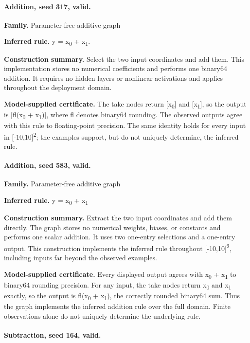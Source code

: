 \paragraph{Addition, seed 317, valid.}

\textbf{Family.} Parameter-free additive graph


\textbf{Inferred rule.} y = x\textsubscript{0} + x\textsubscript{1}.


\textbf{Construction summary.} Select the two input coordinates and add them. This implementation stores no numerical coefficients and performs one binary64 addition. It requires no hidden layers or nonlinear activations and applies throughout the deployment domain.


\textbf{Model-supplied certificate.} The take nodes return [x\textsubscript{0}] and [x\textsubscript{1}], so the output is [fl(x\textsubscript{0} + x\textsubscript{1})], where fl denotes binary64 rounding. The observed outputs agree with this rule to floating-point precision. The same identity holds for every input in [-10,10]\textsuperscript{2}; the examples support, but do not uniquely determine, the inferred rule.


\paragraph{Addition, seed 583, valid.}

\textbf{Family.} Parameter-free additive graph


\textbf{Inferred rule.} y = x\textsubscript{0} + x\textsubscript{1}


\textbf{Construction summary.} Extract the two input coordinates and add them directly. The graph stores no numerical weights, biases, or constants and performs one scalar addition. It uses two one-entry selections and a one-entry output. This construction implements the inferred rule throughout [-10,10]\textsuperscript{2}, including inputs far beyond the observed examples.


\textbf{Model-supplied certificate.} Every displayed output agrees with x\textsubscript{0} + x\textsubscript{1} to binary64 rounding precision. For any input, the take nodes return x\textsubscript{0} and x\textsubscript{1} exactly, so the output is fl(x\textsubscript{0} + x\textsubscript{1}), the correctly rounded binary64 sum. Thus the graph implements the inferred addition rule over the full domain. Finite observations alone do not uniquely determine the underlying rule.


\paragraph{Subtraction, seed 164, valid.}

